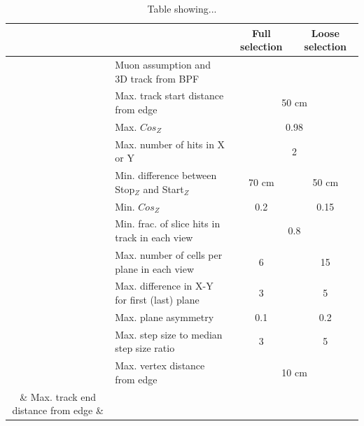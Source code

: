 \documentclass[12pt]{article}
\begin{document}
\begin{table}[]
\centering
\begin{tabular}{clcc}
& \centering{\textbf{Cut}} & \cellcolor[HTML]{3166FF}\textbf{Full selection} & \cellcolor[HTML]{32CB00}\textbf{Loose selection} \\ \hline
                                   & Muon assumption and 3D track from BPF         &                                             &                                          \\
                                   & Max. track start distance from edge                       & \multicolumn{2}{c}{50 cm}                                                                 \\
                                   & Max. $Cos_{Z}$                                            & \multicolumn{2}{c}{0.98}                                                               \\ \hline
                                   & Max. number of hits in X or Y                             & \multicolumn{2}{c}{\cellcolor[HTML]{FFFFFF}2}                                          \\
                                   & Min. difference between Stop$_{Z}$ and Start$_{Z}$        & \cellcolor[HTML]{3166FF}70 cm                 & \cellcolor[HTML]{32CB00}50 cm             \\
                                   & Min. $Cos_{Z}$ & \cellcolor[HTML]{3166FF}0.2                 & \cellcolor[HTML]{32CB00}0.15             \\
                                   & Min. frac. of slice hits in track in each view    & \multicolumn{2}{c}{0.8}                                                                \\
                                   & Max. number of cells per plane in each view               & \cellcolor[HTML]{3166FF}6                   & \cellcolor[HTML]{32CB00}15               \\
                                   & Max. difference in X-Y for first (last) plane     & \cellcolor[HTML]{3166FF}3                   & \cellcolor[HTML]{32CB00}5                \\
                                   & Max. plane asymmetry                                      & \cellcolor[HTML]{3166FF}0.1                 & \cellcolor[HTML]{32CB00}0.2              \\
                                   & Max. step size to median step size ratio                  & \cellcolor[HTML]{3166FF}3                   & \cellcolor[HTML]{32CB00}5                \\
                                   & \cellcolor[HTML]{C0C0C0}Max. vertex distance from edge    & \multicolumn{2}{c}{\cellcolor[HTML]{C0C0C0}10 cm}                                         \\
\parbox[t]{2mm}{}& Max. track end distance from edge & 
\end{tabular}
\caption{Table showing...}
\label{tabSelection}
\end{table}
\end{document}
